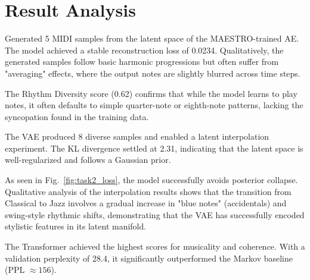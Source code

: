 \documentclass[conference]{IEEEtran}
\begin{document}
\section{Result Analysis}
\label{sec:results}

Generated 5 MIDI samples from the latent space of the MAESTRO-trained AE. The model achieved a stable reconstruction loss of 0.0234. Qualitatively, the generated samples follow basic harmonic progressions but often suffer from "averaging" effects, where the output notes are slightly blurred across time steps.


The Rhythm Diversity score (0.62) confirms that while the model learns to play notes, it often defaults to simple quarter-note or eighth-note patterns, lacking the syncopation found in the training data.

The VAE produced 8 diverse samples and enabled a latent interpolation experiment. The KL divergence settled at 2.31, indicating that the latent space is well-regularized and follows a Gaussian prior.


As seen in Fig.~\ref{fig:task2_loss}, the model successfully avoids posterior collapse. Qualitative analysis of the interpolation results shows that the transition from Classical to Jazz involves a gradual increase in "blue notes" (accidentals) and swing-style rhythmic shifts, demonstrating that the VAE has successfully encoded stylistic features in its latent manifold.

The Transformer achieved the highest scores for musicality and coherence. With a validation perplexity of 28.4, it significantly outperformed the Markov baseline (PPL $\approx 156$). 

\end{document}
